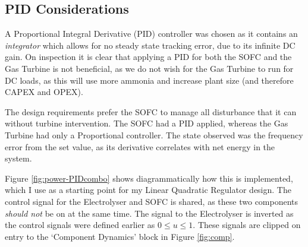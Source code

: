 \subsection{PID Considerations}
\label{sec:power-pid}

A Proportional Integral Derivative (PID) controller was chosen as it contains an \emph{integrator} which allows for no steady state tracking error, due to its infinite DC gain.
On inspection it is clear that applying a PID for both the SOFC and the Gas Turbine is not beneficial, as we do not wish for the Gas Turbine to run for DC loads, as this will use more ammonia and increase plant size (and therefore CAPEX and OPEX).

The design requirements prefer the SOFC to manage all disturbance that it can without turbine intervention. The SOFC had a PID applied, whereas the Gas Turbine had only a Proportional controller.
The state observed was the frequency error from the set value, as its derivative correlates with net energy in the system.

Figure \ref{fig:power-PIDcombo} shows diagrammatically how this is implemented, which I use as a starting point for my Linear Quadratic Regulator design.
The control signal for the Electrolyser and SOFC is shared, as these two components \emph{should not} be on at the same time. The signal to the Electrolyser is inverted as the control signals were defined earlier as $0 \leq u \leq 1$.
These signals are clipped on entry to the `Component Dynamics' block in Figure \ref{fig:comp}.

